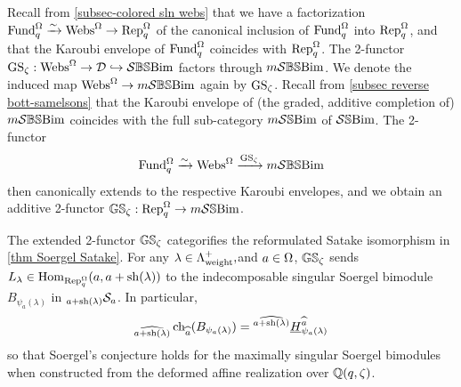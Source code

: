 Recall from \cref{subsec-colored sln webs} that we have a factorization $\operatorname{Fund}_q^{\Omega} \xrightarrow{\sim} \operatorname{Webs}^{\Omega} \rightarrow \operatorname{Rep}_q^{\Omega}$ of the canonical inclusion of $\operatorname{Fund}_q^{\Omega}$ into $\operatorname{Rep}_q^{\Omega}$, and that the Karoubi envelope of $\operatorname{Fund}_q^{\Omega}$ coincides with $\operatorname{Rep}_q^{\Omega}$.
The 2-functor $\operatorname{GS}_\zeta: \operatorname{Webs}^{\Omega} \rightarrow \mathcal{D} \hookrightarrow \mathcal{S}\mathbb{BS}\text{Bim}$ factors through $m\mathcal{S}\mathbb{BS}\text{Bim}$. We denote the induced map $\operatorname{Webs}^{\Omega} \rightarrow m\mathcal{S}\mathbb{BS}\text{Bim}$ again by $\operatorname{GS}_\zeta$.
Recall from \cref{subsec reverse bott-samelsons} that the Karoubi envelope of (the graded, additive completion of) $m\mathcal{S}\mathbb{BS}\text{Bim}$ coincides with the full sub-category $m\mathcal{S}\mathbb{S}\text{Bim}$ of $\mathcal{S}\mathbb{S}\text{Bim}$.
The 2-functor 
$$\operatorname{Fund}_q^{\Omega} \xrightarrow{\sim} \operatorname{Webs}^{\Omega} \xrightarrow{\operatorname{GS}_\zeta} m\mathcal{S}\mathbb{BS}\text{Bim}$$
then canonically extends to the respective Karoubi envelopes, and we obtain an additive 2-functor $\mathbb{GS}_\zeta: \operatorname{Rep}_q^{\Omega} \rightarrow m\mathcal{S}\mathbb{S}\text{Bim}$. 



\begin{lemma}\label{lemma GS functor sends simples to indecomposables}
    The extended 2-functor $\mathbb{GS}_\zeta$ categorifies the reformulated Satake isomorphism in \cref{thm Soergel Satake}.
    For any $\lambda \in \Lambda_{\operatorname{weight}}^+,$and $a\in \Omega$, $\mathbb{GS}_\zeta$ sends $L_\lambda \in \operatorname{Hom}_{\operatorname{Rep}_q^{\Omega}}(a,a+\operatorname{sh}(\lambda))$ to the indecomposable singular Soergel bimodule $B_{\psi_a(\lambda)}$ in ${}_{a+\operatorname{sh}(\lambda)}\mathcal{S}_{a}$. 
    In particular, 
\begin{equation} \label{thistoogoestoKL} {}_{\widehat{a+\operatorname{sh}(\lambda)}}\operatorname{ch}_{\widehat{a}}(B_{\psi_a(\lambda)})={}^{\widehat{a+\operatorname{sh}(\lambda)}}\underline{H}^{\widehat{a}}_{\psi_a(\lambda)}\end{equation}
    so that Soergel's conjecture holds for the maximally singular Soergel bimodules when constructed from the deformed affine realization over $\mathbb{Q}(q,\zeta)$.
\end{lemma}

